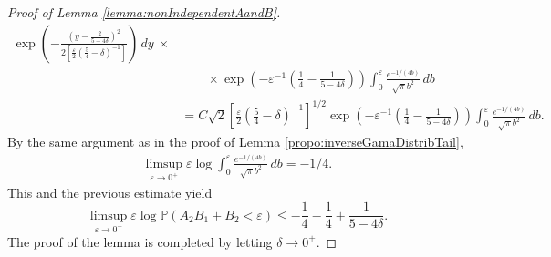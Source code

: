 \documentclass[bj]{imsart}
\numberwithin{equation}{section}
\renewcommand{\P}{\mathbb{P}}
\newcommand{\1}{\mathbf{1}}
\theoremstyle{definition}
\begin{document}
\begin{proof}[Proof of Lemma \ref{lemma:nonIndependentAandB}]
\begin{align*}
\exp\left(-\frac{\left(y-\frac{2}{5-4\delta}\right)^2}{2\left[\frac{\varepsilon}{2}\left(\frac{5}{4}-\delta\right)^{-1}\right]}\right) \, dy\ \times\\ 
& \qquad \times\exp\left(-\varepsilon^{-1}\left(\frac{1}{4}-\frac{1}{5-4\delta}\right)\right)\int_0^{\varepsilon}\frac{e^{-1/(4b)}}{\sqrt{\pi} b^2}\, db\\
&= C\sqrt{2}\left[\frac{\varepsilon}{2}\left(\frac{5}{4}-\delta\right)^{-1}\right]^{1/2}\exp\left(-\varepsilon^{-1}\left(\frac{1}{4}-\frac{1}{5-4\delta}\right)\right)\int_0^{\varepsilon}
\frac{e^{-1/(4b)}}{\sqrt{\pi} b^2}\, db.
\end{align*}
By the same argument as in the proof of Lemma \ref{propo:inverseGamaDistribTail},
\begin{align*}
\limsup_{\varepsilon\to 0^+} \varepsilon\log 
\int_0^{\varepsilon}
\frac{e^{-1/(4b)}}{\sqrt{\pi} b^2}\, db = -1/4.
\end{align*}
This and the previous estimate yield
$$\limsup_{\varepsilon\to 0^+} \varepsilon\log \P(A_2B_1+B_2<\varepsilon) \leq -\frac{1}{4}-\frac{1}{4}+\frac{1}{5-4\delta}.$$
The proof of the lemma is completed by letting $\delta \to 0^+$.
\end{proof}
\end{document}
